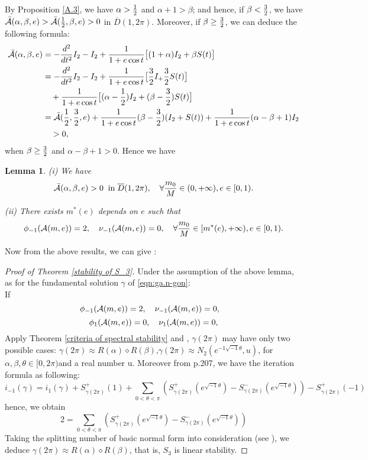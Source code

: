 \documentclass[11pt]{article}
\newtheorem{lemma}{Lemma}[section]
\def\cA{{\cal A}}
\def\ol#1{\overline{#1}}
\begin{document}
By Proposition \ref{A.3},
we have $\alpha>{1\over2}$ and
$\alpha+1>\beta$;
and hence, if $\beta<{3\over2}$,
we have
$\bar\cA(\alpha,\beta,e)>\bar\cA({1\over2},\beta,e)>0$ in $\ol{D}(1,2\pi)$.
Moreover, if $\beta\ge{3\over2}$,
we can deduce the following formula:
\begin{align}
    \bar \cA(\alpha,\beta,e)&=-{d^2\over dt^2}I_2-I_2+{1\over1+e\cos{t}}\big[(1+\alpha)I_2+\beta S(t)\big]\\
    &=-{d^2\over dt^2}I_2-I_2+{1\over1+e\cos{t}}\big[{3\over 2}I_+{3\over 2}S(t)\big]\\
    &\quad +{1\over1+e\cos{t}}\big[(\alpha-{1\over2})I_2+(\beta -{3 \over 2})S(t)\big]\\
    &=\bar\cA({1\over2},{3\over2},e)+{1\over1+e\cos{t}}(\beta-{3\over 2})(I_2+S(t))+{1\over1+e\cos{t}}(\alpha-\beta +1)I_2\\
    &\quad>0,
\end{align}
when $\beta\ge{3\over 2}$ and $\alpha-\beta+1>0.$ 
Hence we have
\begin{lemma}
    (i) We have
    \begin{equation}
    \bar\cA(\alpha,\beta,e)>0
    \;\;
    {\rm in}\;\ol{D}(1,2\pi),
    \quad
    \forall {m_0\over M}\in(0,+\infty),e\in[0,1).
    \end{equation}
    
    (ii) There exists $m^*(e)$ depends on $e$ such that
    \begin{equation}
    \phi_{-1}(\cA(m,e))=2,
    \quad
    \nu_{-1}(\cA(m,e))=0,
    \quad
    \forall {m_0\over M}\in[m^*(e),+\infty),e\in[0,1).
    \end{equation}
\end{lemma}
Now from the above results, we can give 
:
\begin{proof}[Proof of Theorem \ref{stability of S_3}]
Under the assumption of the above lemma, as for the fundamental solution $\gamma$ of \eqref{eqn:ga.n-gon}:
\\
If
$$
  \phi_{-1}(\cA({m,e}))=2,\quad
  \nu_{-1}(\cA({m,e}))=0,\quad$$
  $$
  \phi_1(\cA({m,e}))=0,\quad
  \nu_1(\cA(m,e))=0,
$$
Apply Theorem \ref{criteria of spectral stability} and \cite{Lon4}, $\gamma(2\pi)$ may have only two possible cases: $\gamma(2\pi) \approx R(\alpha) \diamond R (\beta)$,$\gamma(2\pi) \approx N_2(e^{-1\sqrt{-1}\theta},u)$, for $\alpha,\beta, \theta \in [0,2\pi) $and a real number u. Moreover from \cite{Lon4} p.207, we have the iteration formula as following:
$$
i_{-1}(\gamma)=i_1(\gamma)+S^+_{\gamma(2\pi)}(1)+\sum_{0<\theta<\pi}(S^+_{\gamma(2\pi)}(e^{\sqrt{-1}\theta})-S^-_{\gamma(2\pi)}(e^{\sqrt{-1}\theta}))-S^+_{\gamma(2\pi)}(-1)
$$
hence, we obtain
$$
2=\sum_{0<\theta<\pi}(S^+_{\gamma(2\pi)}(e^{\sqrt{-1}\theta})-S^-_{\gamma(2\pi)}(e^{\sqrt{-1}\theta}))
$$
Taking the splitting number of basic normal form into consideration (see \cite{Lon4}), we deduce $\gamma(2\pi) \approx R(\alpha) \diamond R (\beta)$, that is, $S_3$ is linear stability.
\end{proof}
\end{document}
